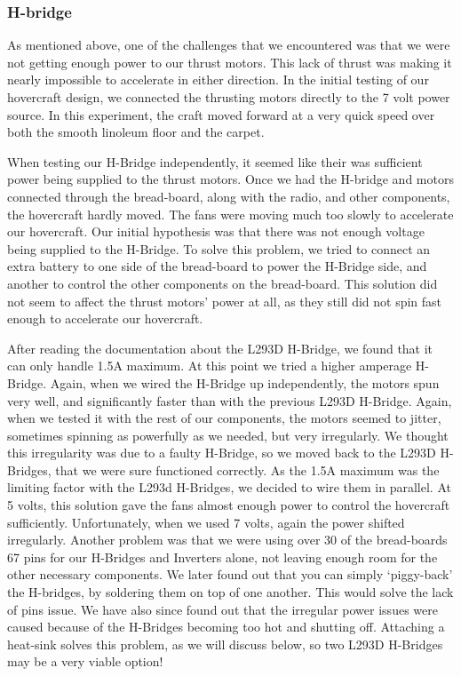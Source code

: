 \subsubsection{H-bridge}
As mentioned above, one of the challenges that we encountered was that we were not getting enough power to our thrust motors. This lack of thrust was making it nearly impossible to accelerate in either direction. In the initial testing of our hovercraft design, we connected the thrusting motors directly to the 7 volt power source. In this experiment, the craft moved forward at a very quick speed over both the smooth linoleum floor and the carpet.

When testing our H-Bridge independently, it seemed like their was sufficient power being supplied to the thrust motors. Once we had the H-bridge and motors connected through the bread-board, along with the radio, and other components, the hovercraft hardly moved. The fans were moving much too slowly to accelerate our hovercraft. Our initial hypothesis was that there was not enough voltage being supplied to the H-Bridge. To solve this problem, we tried to connect an extra battery to one side of the bread-board to power the H-Bridge side, and another to control the other components on the bread-board. This solution did not seem to affect the thrust motors' power at all, as they still did not spin fast enough to accelerate our hovercraft.

After reading the documentation about the L293D H-Bridge, we found that it can only handle 1.5A maximum. At this point we tried a higher amperage H-Bridge. Again, when we wired the H-Bridge up independently, the motors spun very well, and significantly faster than with the previous L293D H-Bridge. Again, when we tested it with the rest of our components, the motors seemed to jitter, sometimes spinning as powerfully as we needed, but very irregularly. We thought this irregularity was due to a faulty H-Bridge, so we moved back to the L293D H-Bridges, that we were sure functioned correctly. As the 1.5A maximum was the limiting factor with the L293d H-Bridges, we decided to wire them in parallel. At 5 volts, this solution gave the fans almost enough power to control the hovercraft sufficiently. Unfortunately, when we used 7 volts, again the power shifted irregularly. Another problem was that we were using over 30 of the bread-boards 67 pins for our H-Bridges and Inverters alone, not leaving enough room for the other necessary components. We later found out that you can simply `piggy-back' the H-bridges, by soldering them on top of one another. This would solve the lack of pins issue. We have also since found out that the irregular power issues were caused because of the H-Bridges becoming too hot and shutting off. Attaching a heat-sink solves this problem, as we will discuss below, so two L293D H-Bridges may be a very viable option!

